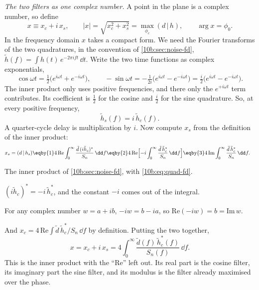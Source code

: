 \emph{The two filters as one complex number.} A point in the plane is a complex number, so define
\begin{equation}
  x\equiv x_c+i\,x_s,\qquad |x|=\sqrt{x_c^2+x_s^2}=\max_{\phi_c}(d\,|\,h),\qquad \arg x=\phi_0 .
\end{equation}
In the frequency domain $x$ takes a compact form. We need the Fourier transforms of the two quadratures, in the
convention of \cref{10b:sec:noise-fd}, $\tilde h(f)=\int h(t)\,e^{-2\pi ift}\,\dd t$. Write the two time functions as
complex exponentials,
\begin{equation}
  \cos\omega t=\tfrac12\bigl(e^{i\omega t}+e^{-i\omega t}\bigr),\qquad
  -\sin\omega t=-\tfrac1{2i}\bigl(e^{i\omega t}-e^{-i\omega t}\bigr)=\tfrac i2\bigl(e^{i\omega t}-e^{-i\omega t}\bigr).
\end{equation}
The inner product only uses positive frequencies, and there only the $e^{+i\omega t}$ term contributes. Its
coefficient is $\tfrac12$ for the cosine and $\tfrac i2$ for the sine quadrature. So, at every positive frequency,
\begin{equation}
  \tilde h_s(f)=i\,\tilde h_c(f).
  \label{10b:eq:quad-fd}
\end{equation}
A quarter-cycle delay is multiplication by $i$. Now compute $x_s$ from the definition of the inner product:
\begin{align}
  x_s=(d\,|\,h_s)
  &\eqby{1}4\,\mathrm{Re}\int_0^\infty\frac{\tilde d\,(i\tilde h_c)^*}{S_n}\,\dd f
   \eqby{2}4\,\mathrm{Re}\Bigl[-i\int_0^\infty\frac{\tilde d\,\tilde h_c^*}{S_n}\,\dd f\Bigr]
   \eqby{3}4\,\mathrm{Im}\int_0^\infty\frac{\tilde d\,\tilde h_c^*}{S_n}\,\dd f .
\end{align}
\begin{explain}
  \item The inner product of \cref{10b:sec:noise-fd}, with \eqref{10b:eq:quad-fd}.
  \item $(i\tilde h_c)^*=-i\,\tilde h_c^*$, and the constant $-i$ comes out of the integral.
  \item For any complex number $w=a+ib$, $-iw=b-ia$, so $\mathrm{Re}(-iw)=b=\mathrm{Im}\,w$.
\end{explain}
And $x_c=4\,\mathrm{Re}\int\tilde d\,\tilde h_c^*/S_n\,\dd f$ by definition. Putting the two together,
\begin{equation}
  x=x_c+i\,x_s=4\int_0^\infty\frac{\tilde d(f)\,\tilde h_c^*(f)}{S_n(f)}\,\dd f .
  \label{10b:eq:complex-filter}
\end{equation}
This is the inner product with the ``Re'' left out. Its real part is the cosine filter, its imaginary part the sine
filter, and its modulus is the filter already maximised over the phase.

